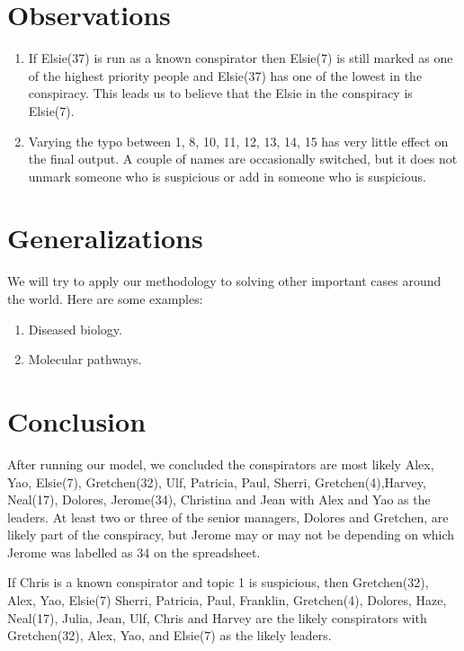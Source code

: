 \documentclass{icmmcm}
\begin{document}
\section{Observations}
\begin{enumerate}

\item If Elsie(37) is run as a known conspirator then Elsie(7) is still marked as one of the highest priority people and Elsie(37) has one of the lowest in the conspiracy.  This leads us to believe that the Elsie in the conspiracy is Elsie(7).

\item Varying the typo between 1, 8, 10, 11, 12, 13, 14, 15 has very little effect on the final output.  A couple of names are occasionally switched, but it does not unmark someone who is suspicious or add in someone who is suspicious.
\end{enumerate}

\section{Generalizations}
We will try to apply our methodology
to solving other important cases around the world.
Here are some examples:
\begin{enumerate}
\item Diseased biology.
\item Molecular pathways.
\end{enumerate}

\section{Conclusion}

After running our model, we concluded the conspirators are most likely Alex, Yao, Elsie(7), Gretchen(32), Ulf, Patricia, Paul, Sherri, Gretchen(4),Harvey, Neal(17), Dolores, Jerome(34), Christina and Jean with Alex and Yao as the leaders. At least two or three of the senior managers, Dolores and Gretchen, are likely part of the conspiracy, but Jerome may or may not be depending on which Jerome was labelled as 34 on the spreadsheet.

 If Chris is a known conspirator and topic 1 is suspicious, then Gretchen(32), Alex, Yao, Elsie(7) Sherri, Patricia, Paul, Franklin, Gretchen(4), Dolores, Haze, Neal(17), Julia, Jean, Ulf, Chris and Harvey are the likely conspirators with Gretchen(32), Alex, Yao, and Elsie(7) as the likely leaders. 
 
\end{document}
